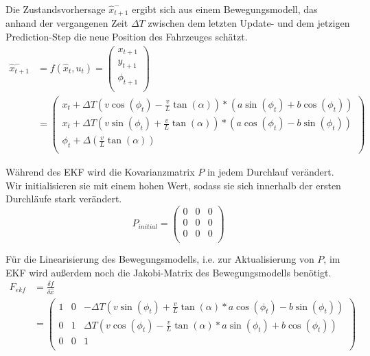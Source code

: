 \documentclass[11pt]{article}
\begin{document}
Die Zustandsvorhersage $\hat{x}_{t+1}^-$ ergibt sich aus einem Bewegungsmodell, das anhand der vergangenen Zeit $\Delta T$ zwischen dem letzten Update- und dem jetzigen Prediction-Step die neue Position des Fahrzeuges schätzt. 
\begin{equation}\label{EKF-Motion-Model}
\begin{split}
	\hat{x}_{t+1}^- &= f(\hat{x}_{t},u_t) = \begin{pmatrix}
		x_{t+1} \\
		y_{t+1} \\
		\phi_{t+1} \\
	  \end{pmatrix} \\
	  &= \begin{pmatrix}
		  x_{t}+\Delta T(v\cos(\phi_t)-\frac{v}{L}\tan(\alpha))*(a\sin(\phi_t)+b\cos(\phi_t)) \\
		  x_{t}+\Delta T(v\sin(\phi_t)+\frac{v}{L}\tan(\alpha))*(a\cos(\phi_t)-b\sin(\phi_t)) \\
		  \phi_t + \Delta(\frac{v}{L}\tan(\alpha)) \\
	  \end{pmatrix}
\end{split}
\end{equation}

Während des EKF wird die Kovarianzmatrix $P$ in jedem Durchlauf verändert. Wir initialisieren sie mit einem hohen Wert, sodass sie sich innerhalb der ersten Durchläufe stark verändert. 
\begin{equation}\label{EKF-Initiale-Kovarianzmatrix}
	P_{initial} = \begin{pmatrix}
		0 & 0 & 0 \\
		0 & 0 & 0 \\
		0 & 0 & 0 \\
	  \end{pmatrix}
\end{equation}

Für die Linearisierung des Bewegungsmodells, i.e. zur Aktualisierung von $P$, im EKF wird außerdem noch die Jakobi-Matrix des Bewegungsmodells benötigt.
\begin{equation}\label{EKF-Motion-Model-Jakobi-Matrix}
\begin{split}
	F_{ekf} &= \frac{\delta f}{\delta \hat{x}} \\
	&= \begin{pmatrix}
		1 & 0 & -\Delta T(v\sin(\phi_t)+\frac{v}{L}\tan(\alpha)*a\cos(\phi_t)-b\sin(\phi_t)) \\
		0 & 1 & \Delta T(v\cos(\phi_t)-\frac{v}{L}\tan(\alpha)*a\sin(\phi_t)+b\cos(\phi_t)) \\
		0 & 0 & 1 \\
	  \end{pmatrix}
\end{split}
\end{equation}
\end{document}
